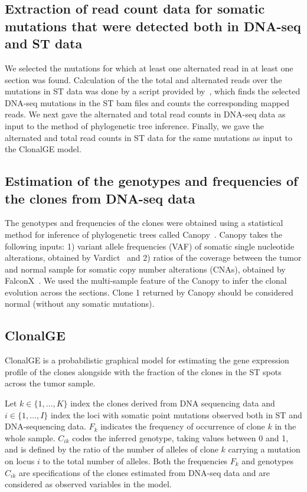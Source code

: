 \documentclass[unnumsec,webpdf,contemporary,large]{oup-authoring-template}%
\theoremstyle{thmstyleone}%
\theoremstyle{thmstyletwo}%
\theoremstyle{thmstylethree}%
\begin{document}
\begin{methods}
\subsection*{Extraction of read count data for  somatic mutations that were detected both in DNA-seq and ST data}
We selected the mutations for which at least one alternated read in at least one section was found. Calculation of the the total and alternated reads over the mutations in ST data was done by a script provided by~\cite{shafighi2024integrative}, which finds the selected DNA-seq mutations in the ST bam files and counts the corresponding mapped reads.  We next gave the alternated and total read counts in DNA-seq data as input to the method of phylogenetic tree inference. Finally, we gave the alternated and total read counts in ST data for the same mutations as input to the ClonalGE model. 

\subsection*{Estimation of the genotypes and frequencies of the  clones from DNA-seq data}
The genotypes and frequencies of the clones were obtained using a statistical method for inference of  phylogenetic trees called Canopy~\citep{jiang2016assessing}. Canopy takes the following inputs: 1) variant allele frequencies (VAF) of somatic single nucleotide alterations, obtained by Vardict~\citep{lai2016vardict} and 2) ratios of the coverage between the tumor and normal sample for somatic copy number alterations (CNAs), obtained by FalconX~\citep{chen2017allele}. We used the multi-sample feature of the Canopy  to infer the clonal evolution across the sections. Clone 1 returned by Canopy should be considered  normal  (without any somatic mutations).


\subsection*{ClonalGE}\label{s:my_model}
ClonalGE is a probabilistic graphical model for estimating the gene expression profile of the clones alongside with the fraction of the clones in the ST spots across the tumor sample. 

Let $k \in \{1, \ldots, K\}$ index the clones derived from DNA sequencing data and $i \in \{1, \ldots, I\}$ index the loci with somatic point mutations observed both in ST and DNA-sequencing data. $F_k$ indicates the frequency of occurrence of clone $k$ in the whole sample. $C_{ik}$ codes the inferred genotype, taking values between 0 and 1, and  is defined by the ratio of the number of alleles of clone $k$ carrying a mutation on locus $i$ to the total number of alleles. Both the frequencies $F_k$ and genotypes $C_{ik}$ are specifications of the clones estimated from DNA-seq data and are considered as observed variables in the model. 


\end{methods}
\end{document}
